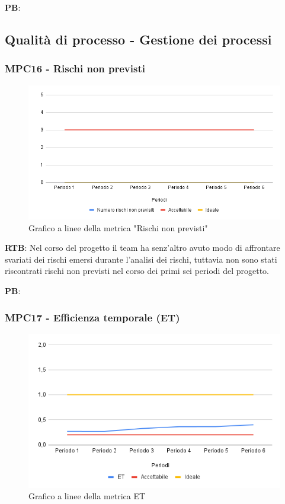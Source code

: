 \documentclass[10pt]{article}
\begin{document}
\begin{justify}
\noindent
\textbf{PB}:


\subsection{Qualità di processo - Gestione dei processi}
\subsubsection{MPC16 - Rischi non previsti}%

\begin{figure}[H]
  \centering
  \includegraphics[width=0.9\linewidth]{RNP.png}
  \caption{Grafico a linee della metrica "Rischi non previsti"}
  \label{fig:RNPchart}
\end{figure}

\textbf{RTB}: Nel corso del progetto il team ha senz'altro avuto modo di affrontare svariati dei rischi emersi durante l'analisi dei rischi, tuttavia non sono stati
riscontrati rischi non previsti nel corso dei primi sei periodi del progetto.

\noindent
\textbf{PB}:


\subsubsection{MPC17 - Efficienza temporale (ET)}%

\begin{figure}[H]
  \centering
  \includegraphics[width=0.9\linewidth]{ET.png}
  \caption{Grafico a linee della metrica ET}
  \label{fig:ETchart}
\end{figure}


\end{justify}
\end{document}
